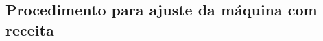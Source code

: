 \ifmachineTypeIcv
  \newpage
  \thispagestyle{fancy}
  \vspace*{40 pt}
\fi

\subsection{Procedimento para ajuste da máquina com receita}


\begin{procedureAdjustmentRecipe}
  

\end{procedureAdjustmentRecipe}
